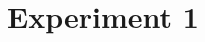 \documentclass[pdflatex,sn-mathphys]{sn-jnl}%
\theoremstyle{thmstyleone}%
\theoremstyle{thmstyletwo}%
\theoremstyle{thmstylethree}%
\begin{document}
% 
% 
% 




\maketitle

\section{Experiment 1}\label{sec1}
\end{document}
